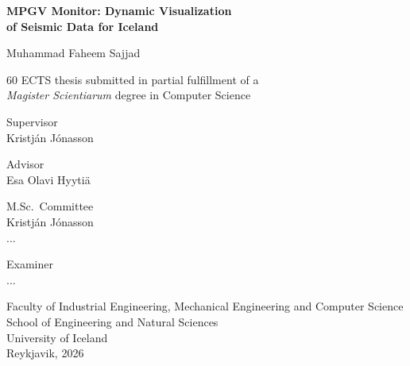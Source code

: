 \documentclass[12pt]{article}
\begin{document}
\begin{titlepage}
    \thispagestyle{empty}
    \begin{center}

        {\Large\sffamily\bfseries MPGV Monitor: Dynamic Visualization\\
        of Seismic Data for Iceland\par}


        {\sffamily Muhammad Faheem Sajjad\par}


        {\normalsize 60 ECTS thesis submitted in partial fulfillment of a\\
        \textit{Magister Scientiarum} degree in Computer Science\par}

        {\large\sffamily Supervisor\\}
        Kristján Jónasson\par

        {\large\sffamily Advisor\\}
        Esa Olavi Hyytiä\par

        {\large\sffamily M.Sc.\ Committee\\}
        Kristján Jónasson\\
        ...\par

        {\large\sffamily Examiner\\}
        ...\par
        

        Faculty of Industrial Engineering, Mechanical Engineering and Computer Science\\
        School of Engineering and Natural Sciences\\
        University of Iceland\\
        Reykjavik, 2026

    \end{center}
\end{titlepage}
\end{document}
